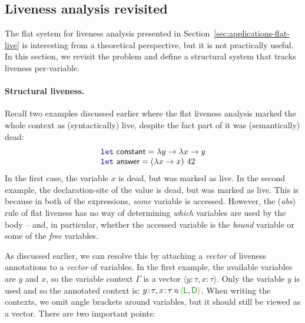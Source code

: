 
\subsection{Liveness analysis revisited}
\label{sec:applications-struct-live}

The flat system for liveness analysis presented in Section~\ref{sec:applications-flat-live} is 
interesting from a theoretical perspective, but it is not practically useful. In this section, we
revisit the problem and define a structural system that tracks liveness per-variable.

\paragraph{Structural liveness.} 
Recall two examples discussed earlier where the flat liveness analysis marked the whole context
as (syntactically) live, despite the fact part of it was (semantically) dead:
%
\begin{equation*}
\begin{array}{l}
\kvd{let}~\ident{constant} = \lambda y \rightarrow \lambda x \rightarrow y\\
\kvd{let}~\ident{answer} = (\lambda x \rightarrow x)~42
\end{array}
\end{equation*}
%
In the first case, the variable $x$ is dead, but was marked as live. In the second example, the
declaration-site of the  value is dead, but was marked as live. This is because in 
both of the expressions, \emph{some} variable is accessed. However, the (\emph{abs}) rule of flat
liveness has no way of determining \emph{which} variables are used by the body -- and, in particular,
whether the accessed variable is the \emph{bound} variable or some of the \emph{free} variables.

As discussed earlier, we can resolve this by attaching a \emph{vector} of liveness annotations to
a \emph{vector} of variables. In the first example, the available variables are $y$ and $x$, so
the variable context $\Gamma$ is a vector $\langle y\!:\!\tau, x\!:\!\tau \rangle$. Only the variable $y$
is used and so the annotated context is: $\coctx{y\!:\!\tau, x\!:\!\tau}{ \alift{\cclrd{\ident{L}}, \cclrd{\ident{D}}} }$.
When writing the contexts, we omit angle brackets around variables, but it should still be viewed
as a vector. There are two important points:

